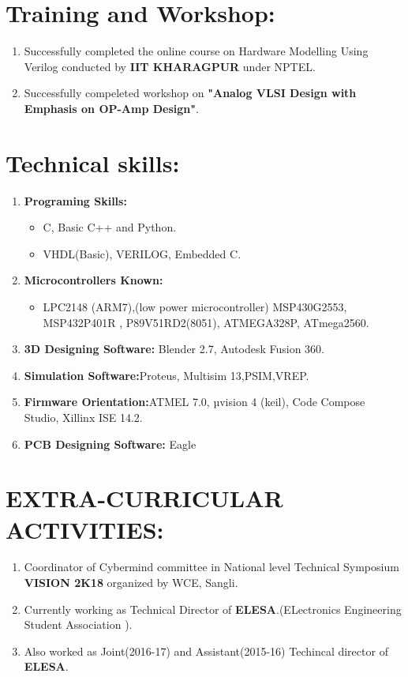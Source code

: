 \documentclass[16pt,a4paper]{article}
\begin{document}
\section{Training and Workshop:} 
\begin{enumerate}
	\item Successfully completed the online course on Hardware Modelling Using Verilog conducted by \textbf{IIT KHARAGPUR} under NPTEL.
	\item Successfully compeleted workshop on \textbf{"Analog VLSI Design with Emphasis on OP-Amp Design"}.
\end{enumerate} 
\section{Technical skills:} 
\begin{enumerate}
	\item \textbf{Programing Skills:}
	\begin{itemize}
		\item C, Basic C++ and  Python.
		\item VHDL(Basic), VERILOG, Embedded C.
	\end{itemize}
	\item \textbf{Microcontrollers Known:}
	\begin{itemize}
		\item LPC2148 (ARM7),(low power microcontroller) MSP430G2553, MSP432P401R , P89V51RD2(8051), ATMEGA328P, ATmega2560.
	\end{itemize}
	\item \textbf{3D Designing Software:}
	Blender 2.7, Autodesk Fusion 360.
	\item \textbf{Simulation Software:}Proteus, Multisim 13,PSIM,VREP.
	\item \textbf{Firmware Orientation:}ATMEL 7.0, µvision 4 (keil), Code Compose \\Studio, Xillinx ISE 14.2.
	\item \textbf{PCB Designing Software:} Eagle 
\end{enumerate}
\section{EXTRA-CURRICULAR ACTIVITIES:}
\begin{enumerate}
	\item Coordinator of Cybermind committee in National level Technical Symposium \textbf{VISION 2K18} organized by WCE, Sangli.
	\item Currently working as Technical Director of \textbf{ELESA}.(ELectronics Engineering Student Association ).
	\item Also worked as Joint(2016-17) and Assistant(2015-16) Techincal director of \textbf{ELESA}.
\end{enumerate}
\end{document}
